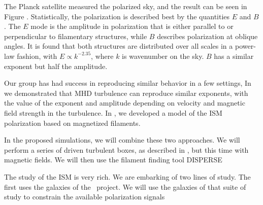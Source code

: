 The Planck satellite  measured the polarized sky, and the result can be
seen in Figure .  Statistically, the polarization is described best
by the quantities $E$ and $B$.  The $E$ mode is the amplitude in polarization
that is either parallel to or perpendicular to filamentary structures, while $B$
describes polarization at oblique angles.  It is found that both structures are
distributed over all scales in a power-law fashion, with $E \propto k^{-2.35}$,
where $k$ is wavenumber on the sky. $B$ has a similar exponent but half the
amplitude.  

Our group has had success in reproducing similar behavior in a few settings, 
In  we demonstrated that MHD turbulence can reproduce
similar exponents, with the value of the exponent and amplitude depending on
velocity and magnetic field strength in the turbulence.  In
\citet{Huffenberger20}, we developed a model of the ISM polarization based on
magnetized filaments.   

In the proposed simulations, we will combine these two approaches.  We will
perform a series of driven turbulent boxes, as described in , but this
time with magnetic fields.  We will then use the filament finding tool DISPERSE

The study of the ISM is very rich.  We are embarking of two lines of study.  The
first uses the galaxies of the \nameGalaxies\ project.  We will use the galaxies
of that suite of study to constrain the available polarization signals 

